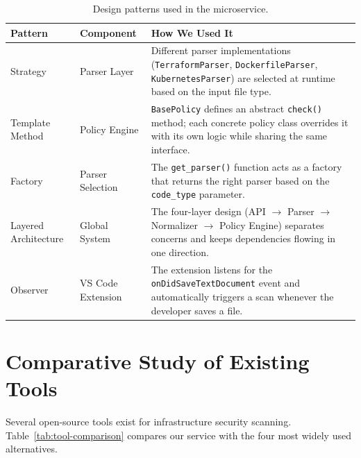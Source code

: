 \begin{table}[H]
\centering
\begin{tabularx}{\textwidth}{|l|l|X|}
\hline
\textbf{Pattern} & \textbf{Component} & \textbf{How We Used It} \\
\hline
Strategy & Parser Layer & Different parser implementations (\texttt{TerraformParser}, \texttt{DockerfileParser}, \texttt{KubernetesParser}) are selected at runtime based on the input file type. \\
\hline
Template Method & Policy Engine & \texttt{BasePolicy} defines an abstract \texttt{check()} method; each concrete policy class overrides it with its own logic while sharing the same interface. \\
\hline
Factory & Parser Selection & The \texttt{get\_parser()} function acts as a factory that returns the right parser based on the \texttt{code\_type} parameter. \\
\hline
Layered Architecture & Global System & The four-layer design (API $\rightarrow$ Parser $\rightarrow$ Normalizer $\rightarrow$ Policy Engine) separates concerns and keeps dependencies flowing in one direction. \\
\hline
Observer & VS Code Extension & The extension listens for the \texttt{onDidSaveTextDocument} event and automatically triggers a scan whenever the developer saves a file. \\
\hline
\end{tabularx}
\caption{Design patterns used in the microservice.}
\label{tab:design-patterns}
\end{table}


\section{Comparative Study of Existing Tools}
\label{sec:comparative}

Several open-source tools exist for infrastructure security scanning. Table~\ref{tab:tool-comparison} compares our service with the four most widely used alternatives.

